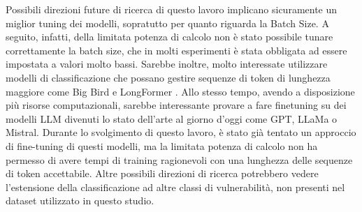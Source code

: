 \documentclass[../../Thesis.tex]{subfiles}
\begin{document}
Possibili direzioni future di ricerca di questo lavoro implicano sicuramente un miglior tuning dei modelli, sopratutto per quanto riguarda la Batch Size. A seguito, infatti, della limitata potenza di calcolo non \`e stato possibile tunare correttamente la batch size, che in molti esperimenti \`e stata obbligata ad essere impostata a valori molto bassi. Sarebbe inoltre, molto interessate utilizzare modelli di classificazione che possano gestire sequenze di token di lunghezza maggiore come Big Bird \cite{BigBird} e LongFormer \cite{Longformer}. Allo stesso tempo, avendo a disposizione pi\`u risorse computazionali, sarebbe interessante provare a fare finetuning su dei modelli LLM divenuti lo stato dell'arte al giorno d'oggi come GPT, LLaMa o Mistral. Durante lo svolgimento di questo lavoro, \`e stato gi\`a tentato un approccio di fine-tuning di questi modelli, ma la limitata potenza di calcolo non ha permesso di avere tempi di training ragionevoli con una lunghezza delle sequenze di token accettabile. Altre possibili direzioni di ricerca potrebbero vedere l'estensione della classificazione ad altre classi di vulnerabilit\`a, non presenti nel dataset utilizzato in questo studio. 
\end{document}
